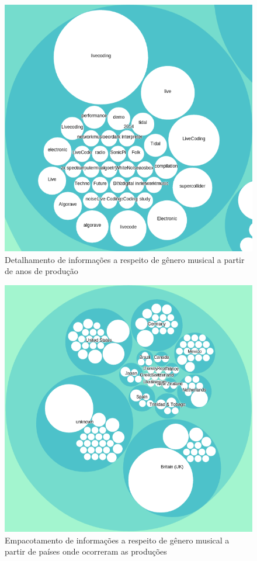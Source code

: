 \begin{figure}
\begin{center}
\includegraphics[scale=0.6]{./imagens/zoomable_circle_packing_genre_year_livecoding2.png}
\caption{Detalhamento de informações a respeito de gênero musical a partir de anos de produção}
\label{pacotao2}
\end{center}
\end{figure}

\begin{figure}
\begin{center}
\includegraphics[scale=0.6]{./imagens/zoomable_circle_packing_genre_year_livecoding3.png}
\caption{Empacotamento de informações a respeito de gênero musical a partir de países onde ocorreram as produções}
\label{pacotao3}
\end{center}
\end{figure}

